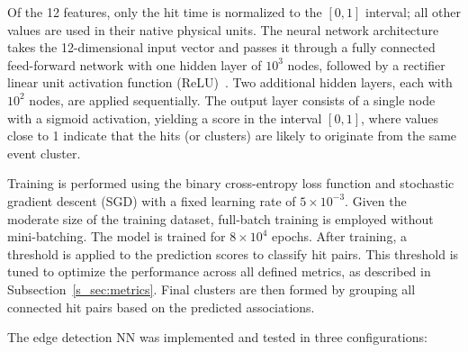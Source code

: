 \documentclass[final,5p,times,twocolumn]{elsarticle}
\begin{document}
Of the 12 features, only the hit time is normalized to the $[0, 1]$ interval; all other values are used in their native physical units.
The neural network architecture takes the 12-dimensional input vector and passes it through a fully connected feed-forward network with one hidden layer of $10^3$ nodes, followed by a rectifier linear unit activation function (ReLU)~\cite{agarap2018deep}. Two additional hidden layers, each with $10^2$ nodes, are applied sequentially. The output layer consists of a single node with a sigmoid activation, yielding a score in the interval $[0, 1]$, where values close to 1 indicate that the hits (or clusters) are likely to originate from the same event cluster.\newline

Training is performed using the binary cross-entropy loss function \cite{mannor2005cross,de2005tutorial} and stochastic gradient descent (SGD) \cite{newton2018recent} with a fixed learning rate of $5 \times 10^{-3}$. Given the moderate size of the training dataset, full-batch training is employed without mini-batching. The model is trained for $8 \times 10^4$ epochs. After training, a threshold is applied to the prediction scores to classify hit pairs. This threshold is tuned to optimize the performance across all defined metrics, as described in Subsection~\ref{s_sec:metrics}. Final clusters are then formed by grouping all connected hit pairs based on the predicted associations.

The edge detection NN was implemented and tested in three configurations:
\end{document}

